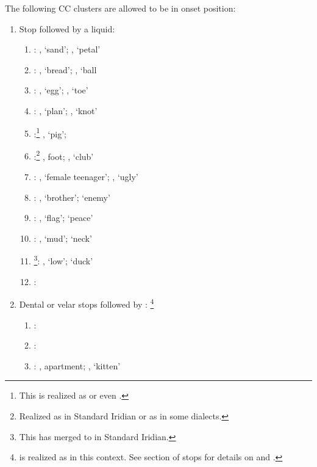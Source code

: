 \par The following CC clusters are allowed to be in onset position:

\begin{enumerate}
	\item Stop followed by a liquid:
		\begin{enumerate}
			\item {}:  , `sand';  , `petal'
			\item {}:  , `bread';  , `ball
			\item {}:  , `egg';  , `toe'
			\item {}:  , `plan'; ,  `knot'
			\item {}:\footnote{This is realized as  or even \bt{\llb}.}  , `pig';  
			\item {}:\footnote{Realized as  in Standard Iridian or as  in some dialects.}  , foot;  , `club'
			\item {}:  , `female teenager';  , `ugly'
			\item {}:  , `brother';   `enemy'
			\item {}:  , `flag';   `peace'
			\item {}:  , `mud';   `neck'
			\item {}\footnote{This has merged to  in Standard Iridian.}:  , `low';   `duck'
			\item {}:  
		\end{enumerate}
	\item Dental or velar stops followed by : \footnote{ is realized as  in this context. See section of stops for details on  and .}
		\begin{enumerate}
			\item {}:
			\item {}:
			\item {}:  , apartment;  , `kitten'

\end{enumerate}
\end{enumerate}
